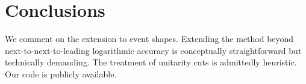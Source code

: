 \section{Conclusions}\label{sec:conclusions}

We comment on the extension to event shapes. Extending the method beyond
next-to-next-to-leading logarithmic accuracy is conceptually
straightforward but technically demanding. The treatment of unitarity
cuts is admittedly heuristic. Our code is publicly available.

